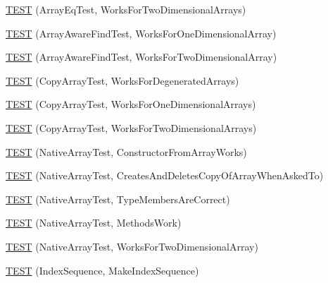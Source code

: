 \begin{DoxyCompactItemize}
\item 
\mbox{\hyperlink{googletest-master_2googletest_2test_2gtest__unittest_8cc_ab18237f1a37018db8b5a78ae84b209ec}{T\+E\+ST}} (Array\+Eq\+Test, Works\+For\+Two\+Dimensional\+Arrays)
\item 
\mbox{\hyperlink{googletest-master_2googletest_2test_2gtest__unittest_8cc_a563807f4b8c6d7fbf2945f279e38468e}{T\+E\+ST}} (Array\+Aware\+Find\+Test, Works\+For\+One\+Dimensional\+Array)
\item 
\mbox{\hyperlink{googletest-master_2googletest_2test_2gtest__unittest_8cc_a1ca0fb8b6355671bbe5a62300585db5a}{T\+E\+ST}} (Array\+Aware\+Find\+Test, Works\+For\+Two\+Dimensional\+Array)
\item 
\mbox{\hyperlink{googletest-master_2googletest_2test_2gtest__unittest_8cc_ad6d3761861147173657e547cb118877f}{T\+E\+ST}} (Copy\+Array\+Test, Works\+For\+Degenerated\+Arrays)
\item 
\mbox{\hyperlink{googletest-master_2googletest_2test_2gtest__unittest_8cc_a0155f940cddc15a77da7df03325c6d1d}{T\+E\+ST}} (Copy\+Array\+Test, Works\+For\+One\+Dimensional\+Arrays)
\item 
\mbox{\hyperlink{googletest-master_2googletest_2test_2gtest__unittest_8cc_a1f1a5d3bb2ce15ff081f359e4494a739}{T\+E\+ST}} (Copy\+Array\+Test, Works\+For\+Two\+Dimensional\+Arrays)
\item 
\mbox{\hyperlink{googletest-master_2googletest_2test_2gtest__unittest_8cc_acba0839db5cf02cdbd658b9fb810066b}{T\+E\+ST}} (Native\+Array\+Test, Constructor\+From\+Array\+Works)
\item 
\mbox{\hyperlink{googletest-master_2googletest_2test_2gtest__unittest_8cc_a227737052f993da5fe2f3294b7f8d184}{T\+E\+ST}} (Native\+Array\+Test, Creates\+And\+Deletes\+Copy\+Of\+Array\+When\+Asked\+To)
\item 
\mbox{\hyperlink{googletest-master_2googletest_2test_2gtest__unittest_8cc_a1f2578d4ac6aeb87d0c7c9574f79ed0c}{T\+E\+ST}} (Native\+Array\+Test, Type\+Members\+Are\+Correct)
\item 
\mbox{\hyperlink{googletest-master_2googletest_2test_2gtest__unittest_8cc_a5f14e3d45e8edc2d22d4e98e7c1422b9}{T\+E\+ST}} (Native\+Array\+Test, Methods\+Work)
\item 
\mbox{\hyperlink{googletest-master_2googletest_2test_2gtest__unittest_8cc_a148c11619d001fac39dae12428534b00}{T\+E\+ST}} (Native\+Array\+Test, Works\+For\+Two\+Dimensional\+Array)
\item 
\mbox{\hyperlink{googletest-master_2googletest_2test_2gtest__unittest_8cc_a387a341993c619b19786b6c5cf589160}{T\+E\+ST}} (Index\+Sequence, Make\+Index\+Sequence)

\end{DoxyCompactItemize}
